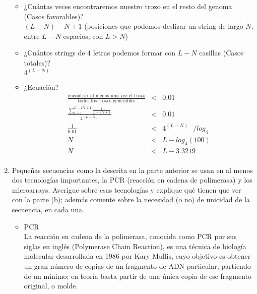 \begin{enumerate}
		\begin{itemize}
			\item ¿Cuántas veces encontraremos nuestro trozo en el
				resto del genoma (Casos favorables)?\\

				$(L - N) - N + 1$
				(posiciones que podemos deslizar un string de largo $N$,
				entre $L - N$ espacios, con $L > N$)

			\item ¿Cuántos strings de 4 letras podemos formar con $L - N$
				casillas (Casos totales)?\\

				$4^{(L-N)}$

			\item ¿Ecuación?\\

				\begin{eqnarray}
					\frac{\text{encontrar al menos una vez el trozo}}{\text{todos los trozos generables}} &<& 0.01\\
					\frac{\sum_{i=1}^{L- 2N + 1} \frac{1}{L - 2N + 1}}{4^{(L-N)}} &<& 0.01\\
					\frac{1}{0.01} &<& 4^{(L-N)} \ \ \ / log_{4}\\
					N &<& L - log_{4}(100)\\
					N &<& L - 3.3219\\
				\end{eqnarray}

\end{itemize}

\item Pequeñas secuencias como la descrita en la parte anterior
	se usan en al menos dos tecnologías importantes, la PCR
	(reacción en cadena de polimerasa) y los microarrays.
	Averigue sobre esas tecnologías y explique qué tienen que
	ver con la parte (b); además comente sobre la necesidad (o no)
	de unicidad de la secuencia, en cada una.

	\begin{itemize}
		\item PCR \\

			La reacción en cadena de la polimerasa, conocida como
			PCR por sus siglas en inglés (Polymerase Chain Reaction),
			es una técnica de biología molecular desarrollada en 
			1986 por Kary Mullis, cuyo objetivo es obtener un gran
			número de copias de un fragmento de ADN particular,
			partiendo de un mínimo; en teoría basta partir de 
			una única copia de ese fragmento original, o molde.
			

\end{itemize}
\end{enumerate}
